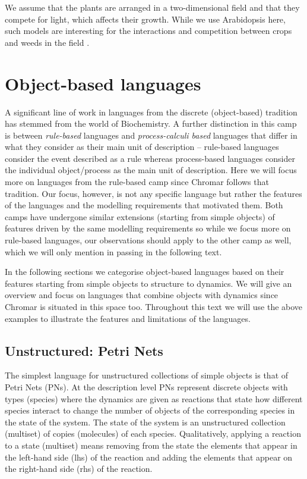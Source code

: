 We assume that the plants are arranged in a two-dimensional field and that they
compete for light, which affects their growth. While we use Arabidopsis here,
such models are interesting for the interactions and competition between crops
and weeds in the field \citep{rajcan_understanding_2001}.


\section{Object-based languages}
\label{sec:objectLangs}
A significant line of work in languages from the discrete (object-based)
tradition has stemmed from the world of Biochemistry. A further distinction in
this camp is between \emph{rule-based} languages and \emph{process-calculi
  based} languages that differ in what they consider as their main unit of
description -- rule-based languages consider the event described as a rule
whereas process-based languages consider the individual object/process as the
main unit of description. Here we will focus more on languages from the
rule-based camp since Chromar follows that tradition. Our focus, however, is not
any specific language but rather the features of the languages and the modelling
requirements that motivated them. Both camps have undergone similar extensions
(starting from simple objects) of features driven by the same modelling
requirements so while we focus more on rule-based languages, our observations
should apply to the other camp as well, which we will only mention in passing in
the following text.

In the following sections we categorise object-based languages based on their
features starting from simple objects to structure to dynamics. We will give an
overview and focus on languages that combine objects with dynamics since Chromar
is situated in this space too. Throughout this text we will use the above
examples to illustrate the features and limitations of the languages.

\subsection{Unstructured: Petri Nets}
\label{subsec:pns}
The simplest language for unstructured collections of simple objects is that of
Petri Nets (PNs). At the description level PNs represent discrete objects with
types (species) where the dynamics are given as reactions that state how
different species interact to change the number of objects of the corresponding
species in the state of the system. The state of the system is an unstructured
collection (multiset) of copies (molecules) of each species. Qualitatively,
applying a reaction to a state (multiset) means removing from the state the
elements that appear in the left-hand side (lhs) of the reaction and adding the
elements that appear on the right-hand side (rhs) of the reaction.

